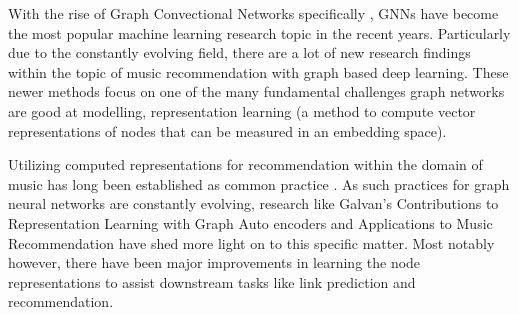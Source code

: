 With the rise of Graph Convectional Networks specifically \cite{kipf17} \cite{rgcn2017}, GNNs have become the most popular machine learning research topic in the recent years. Particularly due to the constantly evolving field, there are a lot of new research findings within the topic of music recommendation with graph based deep learning. These newer methods focus on one of the many fundamental challenges graph networks are good at modelling, representation learning (a method to compute vector representations of nodes that can be measured in an embedding space).\cite{Gao2021}

Utilizing computed representations for recommendation within the domain of music has long been established as common practice \cite{raimond2007music}. As such practices for graph neural networks are constantly evolving, research like Galvan's Contributions to Representation Learning with Graph Auto encoders and Applications to Music Recommendation have shed more light on to this specific matter. \cite{Galvan22} Most notably however, there have been major improvements in learning the node representations to assist downstream tasks like link prediction and recommendation.\cite{Hamilton2020}\cite{kipf2020deep}



